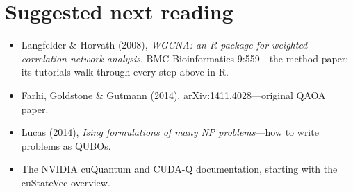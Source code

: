 \documentclass[11pt]{article}
\begin{document}
\section*{Suggested next reading}
\begin{itemize}[nosep]
  \item Langfelder \& Horvath (2008), \emph{WGCNA: an R package for weighted
        correlation network analysis}, BMC Bioinformatics 9:559---the
        method paper; its tutorials walk through every step above in R.
  \item Farhi, Goldstone \& Gutmann (2014), arXiv:1411.4028---original QAOA paper.
  \item Lucas (2014), \emph{Ising formulations of many NP problems}---how to
        write problems as QUBOs.
  \item The NVIDIA cuQuantum and CUDA-Q documentation, starting with the
        cuStateVec overview.
\end{itemize}
\end{document}
